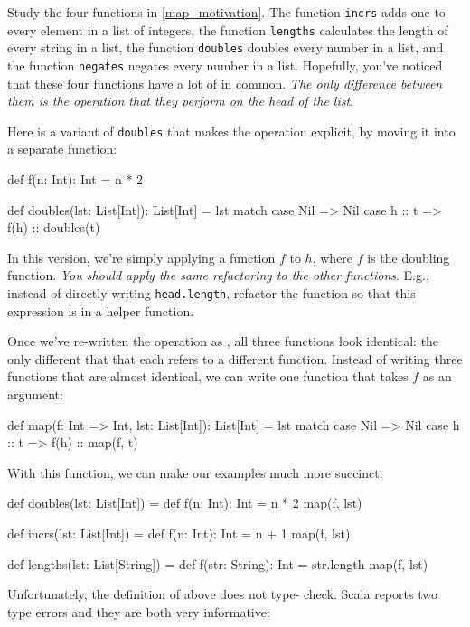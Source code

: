 \documentclass{book}
\begin{document}
Study the four functions in \cref{map_motivation}. The function \verb|incrs|
adds one to every element in a list of integers, the function \verb|lengths|
calculates the length of every string in a list, the function \verb|doubles|
doubles every number in a list, and the function \verb|negates| negates every
number in a list. Hopefully, you've noticed that these four functions have a lot
of in common. \emph{The only difference between them is the operation that they
perform on the head of the list}.

Here is a variant of \verb|doubles| that makes the operation explicit, by
moving it into a separate function:
%
\begin{scalacode}
def f(n: Int): Int = n * 2

def doubles(lst: List[Int]): List[Int] = lst match {
  case Nil => Nil
  case h :: t => f(h) :: doubles(t)
}
\end{scalacode}

In this version, we're simply applying a function $f$ to $h$, where $f$
is the doubling function. \emph{You should apply the same refactoring to the other
functions}. E.g.,  instead of directly writing \verb|head.length|, refactor
the function so that this expression is in a helper function.

Once we've re-written the operation as , all three
functions look identical: the only different that that each refers to a
different function.
Instead of writing three functions that are almost identical, we can
write one function that takes $f$ as an argument:

\begin{scalacode}
def map(f: Int => Int, lst: List[Int]): List[Int] = lst match {
  case Nil => Nil
  case h :: t => f(h) :: map(f, t)
}
\end{scalacode}

With this function, we can make our examples much more succinct:

\begin{scalacode}
def doubles(lst: List[Int]) = {
  def f(n: Int): Int = n * 2
  map(f, lst)
}

def incrs(lst: List[Int]) = {
  def f(n: Int): Int = n + 1
  map(f, lst)
}

def lengths(lst: List[String]) = {
  def f(str: String): Int = str.length
  map(f, lst)
}
\end{scalacode}

Unfortunately, the definition of  above does not type-
check. Scala reports two type errors and they are both very informative:
\end{document}
